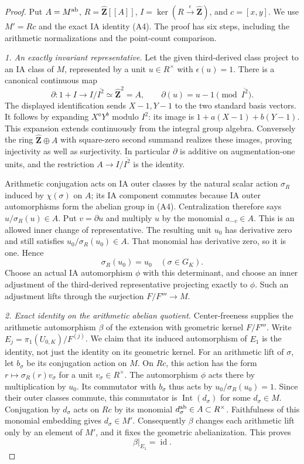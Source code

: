 \documentclass[11pt,oneside]{article}
\begin{document}
\begin{proof}
Put $A=M^{\rm ab}$, $R=\widehat{\mathbf Z}[[A]]$,
$I=\ker(R\xrightarrow\epsilon\widehat{\mathbf Z})$,
and $c=[x,y]$. We use $M'=Rc$ and the exact IA identity
(A4). The proof has six steps, including the arithmetic
normalizations and the point-count comparison.

\emph{1. An exactly invariant representative.}
Let the given third-derived class project to an IA class
of $M$, represented by a unit $u\in R^\times$ with
$\epsilon(u)=1$. There is a canonical continuous map
\[
 \partial:1+I\longrightarrow I/\overline{I^2}
       \simeq\widehat{\mathbf Z}^2=A,
       \qquad \partial(u)=u-1\pmod{\overline{I^2}}.
\]
The displayed identification sends $X-1,Y-1$ to the
two standard basis vectors. It follows by expanding
$X^aY^b$ modulo $I^2$: its image is
$1+a(X-1)+b(Y-1)$. This expansion extends continuously
from the integral group algebra. Conversely the ring
$\widehat{\mathbf Z}\oplus A$ with square-zero second
summand realizes these images, proving injectivity as
well as surjectivity. In particular $\partial$ is
additive on augmentation-one units, and the restriction
$A\to I/\overline{I^2}$ is the identity.

Arithmetic conjugation acts on IA outer classes by the
natural scalar action $\sigma_R$ induced by $\chi(\sigma)$
on $A$; its IA component commutes because IA outer
automorphisms form the abelian group in (A4).
Centralization therefore says
$u/\sigma_R(u)\in A$. Put $v=\partial u$ and multiply
$u$ by the monomial $a_{-v}\in A$. This is an allowed
inner change of representative. The resulting unit
$u_0$ has derivative zero and still satisfies
$u_0/\sigma_R(u_0)\in A$. That monomial has derivative
zero, so it is one. Hence
\[
       \sigma_R(u_0)=u_0\quad(\sigma\in G_K).                 \tag{A26}
\]
Choose an actual IA automorphism $\phi$ with this
determinant, and choose an inner adjustment of the
third-derived representative projecting exactly to
$\phi$. Such an adjustment lifts through the surjection
$F/F'''\to M$.

\emph{2. Exact identity on the arithmetic abelian quotient.}
Center-freeness supplies the arithmetic automorphism
$\beta$ of the extension with geometric kernel $F/F'''$.
Write $E_j=\pi_1(U_{0,K})/F^{(j)}$. We claim that its
induced automorphism of $E_1$ is the identity, not just
the identity on its geometric kernel.
For an arithmetic lift of $\sigma$, let $b_\sigma$ be
its conjugation action on $M$. On $Rc$, this action has
the form $r\mapsto\sigma_R(r)v_\sigma$ for a unit
$v_\sigma\in R^\times$. The automorphism $\phi$ acts
there by multiplication by $u_0$. Its commutator with
$b_\sigma$ thus acts by
$u_0/\sigma_R(u_0)=1$.
Since their outer classes commute, this commutator is
$\operatorname{Int}(d_\sigma)$ for some $d_\sigma\in M$.
Conjugation by $d_\sigma$ acts on $Rc$ by its monomial
$d_\sigma^{\rm ab}\in A\subset R^\times$. Faithfulness
of this monomial embedding gives $d_\sigma\in M'$.
Consequently $\beta$ changes each arithmetic lift only
by an element of $M'$, and it fixes the geometric
abelianization. This proves
\[
                         \beta|_{E_1}=\operatorname{id}.
                                                               \tag{A27}
\]


\end{proof}
\end{document}
